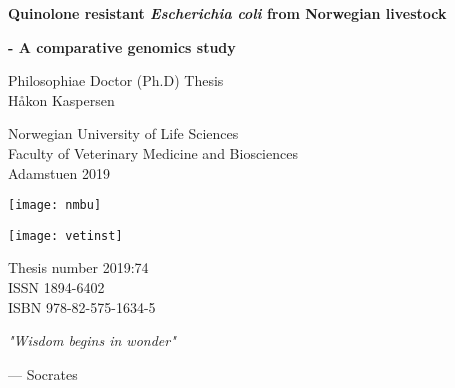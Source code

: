 \frontmatter
{}
{
\pagestyle{empty}
\graphicspath{ {./images/pdfs/} }
\begin{titlepage}
   \begin{center}
       
       \huge
       
       \textbf{Quinolone resistant \textit{Escherichia coli} from Norwegian livestock}
       
       \LARGE
       
       \textbf{- A comparative genomics study}
 
       \vspace{1cm}
       
       \large
       Philosophiae Doctor (Ph.D) Thesis\\
       Håkon Kaspersen
 
       \vspace{1.5cm}
       
       Norwegian University of Life Sciences\\
       Faculty of Veterinary Medicine and Biosciences\\
       Adamstuen 2019
       
       \texttt{[image: nmbu]}
       
       \texttt{[image: vetinst]}
       
       \vfill

 
       \vspace{0.5cm}
       \normalsize
 
       Thesis number 2019:74\\
       ISSN 1894-6402\\
       ISBN 978-82-575-1634-5
 
   \end{center}
\end{titlepage}

\begin{titlepage}
   \null
   \vspace*{\fill}
   \renewcommand{\epigraphsize}{\large}
   \epigraph{\textit{"Wisdom begins in wonder"}}{--- \textup{Socrates}}
\end{titlepage}
}